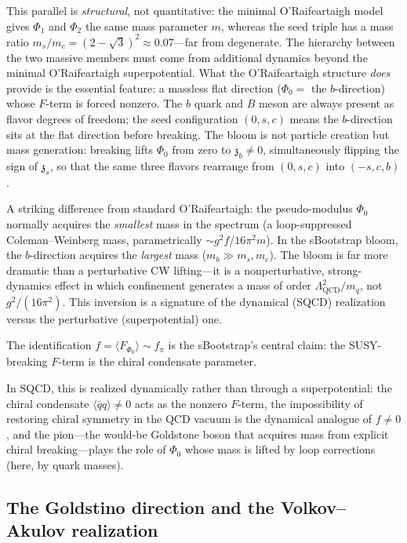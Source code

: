 \documentclass[12pt,a4paper]{article}
\newcommand{\qqbar}{\langle\bar{q}q\rangle}
\newcommand{\zch}{\mathfrak{z}}
\begin{document}
This parallel is \emph{structural}, not quantitative: the minimal 
O'Raifeartaigh model gives $\Phi_1$ and $\Phi_2$ the same mass 
parameter $m$, whereas the seed triple has a mass ratio 
$m_s/m_c = (2 - \sqrt{3})^2 \approx 0.07$---far from degenerate. 
The hierarchy between the two massive members must come from 
additional dynamics beyond the minimal O'Raifeartaigh superpotential. 
What the O'Raifeartaigh structure \emph{does} provide is the essential 
feature: a massless flat direction ($\Phi_0 = $ the $b$-direction) 
whose $F$-term is forced nonzero. The $b$ quark and $B$ meson are 
always present as flavor degrees of freedom; the seed configuration 
$(0, s, c)$ means the $b$-direction sits at the flat direction before 
breaking. The bloom is not particle creation but mass generation: 
breaking lifts $\Phi_0$ from zero to $\zch_b \neq 0$, simultaneously 
flipping the sign of $\zch_s$, so that the same three flavors 
rearrange from $(0, s, c)$ into $(-s, c, b)$.

A striking difference from standard O'Raifeartaigh: the 
pseudo-modulus $\Phi_0$ normally acquires the \emph{smallest} mass 
in the spectrum (a loop-suppressed Coleman--Weinberg mass, 
parametrically $\sim g^2 f/16\pi^2 m$). In the sBootstrap bloom, 
the $b$-direction acquires the \emph{largest} mass 
($m_b \gg m_s, m_c$). The bloom is far more dramatic than a 
perturbative CW lifting---it is a nonperturbative, strong-dynamics 
effect in which confinement generates a mass of order $\Lambda_{\text{QCD}}^2/m_q$, 
not $g^2/(16\pi^2)$. This inversion is a signature of the 
dynamical (SQCD) realization versus the perturbative 
(superpotential) one.

The identification $f = \langle F_{\Phi_0}\rangle \sim f_\pi$ is the 
sBootstrap's central claim: the SUSY-breaking $F$-term is the chiral 
condensate parameter.

In SQCD, this is realized dynamically rather than through a 
superpotential: the chiral condensate $\qqbar \neq 0$ acts as the 
nonzero $F$-term, the impossibility of restoring chiral symmetry 
in the QCD vacuum is the dynamical analogue of $f \neq 0$, and the 
pion---the would-be Goldstone boson that acquires mass from explicit 
chiral breaking---plays the role of $\Phi_0$ whose mass is lifted 
by loop corrections (here, by quark masses).

\subsection{The Goldstino direction and the Volkov--Akulov realization}
\label{subsec:va}
\end{document}
